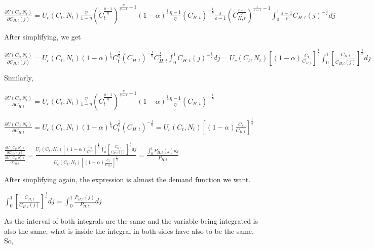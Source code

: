 \documentclass[
]{article}
\begin{document}
\(\displaystyle \frac{\partial U(C_t,N_t)}{\partial C_{H,t}(j)} = U_c(C_t,N_t)\frac{\eta}{1-\eta}\left( C_t^{\frac{\eta-1}{\eta}} \right)^{\frac{\eta}{\eta-1}-1} (1-\alpha)^{\frac{1}{\eta}}\frac{\eta-1}{\eta}\left( C_{H,t}\right)^{-\frac{1}{\eta}}\frac{\varepsilon}{\varepsilon-1}\left(C_{H,t}^{\frac{\varepsilon-1}{\varepsilon}} \right)^{\frac{\varepsilon}{\varepsilon-1}-1}\int_0^1 \frac{\varepsilon-1}{\varepsilon} C_{H,t}(j)^{-\frac{1}{\varepsilon}}dj\)

After simplifying, we get

\(\displaystyle \frac{\partial U(C_t,N_t)}{\partial C_{H,t}(j)} = U_c(C_t,N_t) (1-\alpha)^{\frac{1}{\eta}} C_t^{\frac{1}{\eta}}\left( C_{H,t}\right)^{-\frac{1}{\eta}}C_{H,t}^{\frac{1}{\varepsilon}} \int_0^1 C_{H,t}(j)^{-\frac{1}{\varepsilon}}dj = U_c(C_t,N_t) \left[ (1-\alpha) \frac{C_t}{C_{H,t}} \right]^{\frac{1}{\eta}} \int_0^1 \left[\frac{C_{H,t}}{C_{H,t}(j)}\right]^{\frac{1}{\varepsilon}}dj\)

Similarly,

\(\displaystyle \frac{\partial U(C_t,N_t)}{\partial C_{H,t}} = U_c(C_t,N_t)\frac{\eta}{1-\eta}\left( C_t^{\frac{\eta-1}{\eta}} \right)^{\frac{\eta}{\eta-1}-1} (1-\alpha)^{\frac{1}{\eta}}\frac{\eta-1}{\eta}\left( C_{H,t}\right)^{-\frac{1}{\eta}}\)

\(\displaystyle \frac{\partial U(C_t,N_t)}{\partial C_{H,t}} = U_c(C_t,N_t) (1-\alpha)^{\frac{1}{\eta}} C_t^{\frac{1}{\eta}}\left( C_{H,t}\right)^{-\frac{1}{\eta}} = U_c(C_t,N_t) \left[ (1-\alpha) \frac{C_t}{C_{H,t}} \right]^{\frac{1}{\eta}}\)

\(\displaystyle \frac{\displaystyle \frac{\partial U(C_t,N_t)}{\displaystyle \partial C_{H,t}(j)}}{\frac{\displaystyle \partial U(C_t,N_t)}{\displaystyle \partial C_{H,t}}} = \frac{\displaystyle U_c(C_t,N_t) \left[ (1-\alpha) \frac{C_t}{C_{H,t}} \right]^{\frac{1}{\eta}} \int_0^1 \left[\frac{C_{H,t}}{C_{H,t}(j)}\right]^{\frac{1}{\varepsilon}}dj}{\displaystyle U_c(C_t,N_t) \left[ (1-\alpha) \frac{C_t}{C_{H,t}} \right]^{\frac{1}{\eta}}} = \frac{\displaystyle \int_0^1P_{H,t}(j)dj}{P_{H,t}}\)

After simplifying again, the expression is almost the demand function we
want.

\(\displaystyle \int_0^1 \left[\frac{C_{H,t}}{C_{H,t}(j)}\right]^{\frac{1}{\varepsilon}}dj = \displaystyle \int_0^1 \frac{P_{H,t}(j)}{P_{H,t}}dj\)

As the interval of both integrals are the same and the variable being
integrated is also the same, what is inside the integral in both sides
have also to be the same. So,
\end{document}
